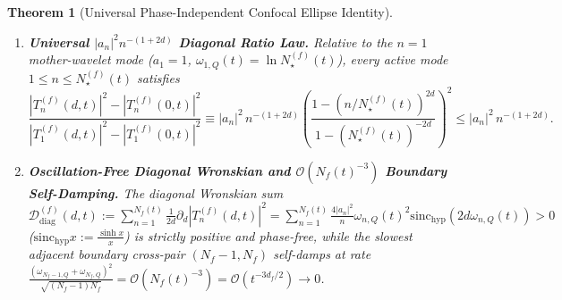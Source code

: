 \documentclass[11pt,reqno]{amsart}
\newtheorem{theorem}{Theorem}[section]
\theoremstyle{definition}
\theoremstyle{remark}
\numberwithin{equation}{section}
\newcommand{\sinch}{\mathrm{sinc}_{\mathrm{hyp}}}
\begin{document}
\begin{theorem}[Universal Phase-Independent Confocal Ellipse Identity]
\begin{enumerate}[label=\textup{(\roman*)},leftmargin=2.2em]
\begin{equation}
\end{equation}
\item \textbf{Universal $|a_n|^2 n^{-(1+2d)}$ Diagonal Ratio Law.} Relative to the $n = 1$ mother-wavelet mode ($a_1 = 1$, $\omega_{1,Q}(t) = \ln N_\star^{(f)}(t)$), every active mode $1 \le n \le N_\star^{(f)}(t)$ satisfies
\begin{equation}\label{eq:diagonal_ratio_law}
\frac{|T_n^{(f)}(d,t)|^2 - |T_n^{(f)}(0,t)|^2}{|T_1^{(f)}(d,t)|^2 - |T_1^{(f)}(0,t)|^2} \equiv |a_n|^2\,n^{-(1+2d)}\left(\frac{1 - (n/N_\star^{(f)}(t))^{2d}}{1 - (N_\star^{(f)}(t))^{-2d}}\right)^{\!2} \le |a_n|^2\,n^{-(1+2d)}.
\end{equation}
\item \textbf{Oscillation-Free Diagonal Wronskian and $\mathcal{O}(N_f(t)^{-3})$ Boundary Self-Damping.} The diagonal Wronskian sum $\mathcal{D}_{\mathrm{diag}}^{(f)}(d,t) := \sum_{n=1}^{N_f(t)} \frac{1}{2d}\partial_d|T_n^{(f)}(d,t)|^2 = \sum_{n=1}^{N_f(t)} \frac{4|a_n|^2}{n}\omega_{n,Q}(t)^2\sinch(2d\omega_{n,Q}(t)) > 0$ ($\sinch x := \frac{\sinh x}{x}$) is strictly positive and phase-free, while the slowest adjacent boundary cross-pair $(N_f-1, N_f)$ self-damps at rate $\frac{(\omega_{N_f-1,Q}+\omega_{N_f,Q})^2}{\sqrt{(N_f-1)N_f}} = \mathcal{O}(N_f(t)^{-3}) = \mathcal{O}(t^{-3d_f/2}) \to 0$.
\end{enumerate}
\end{theorem}
\end{document}
